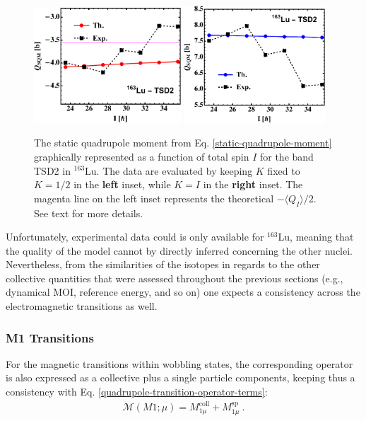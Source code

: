 \begin{figure}
    \centering
    \includegraphics[width=0.49\textwidth]{Chapters/Figures/Q_SQM_163Lu-3.pdf}
    \includegraphics[width=0.47\textwidth]{Chapters/Figures/Q_SQM_163Lu-4.pdf}
    \caption{The static quadrupole moment from Eq. \ref{static-quadrupole-moment} graphically represented as a function of total spin $I$ for the band TSD2 in $^{163}$Lu. The data are evaluated by keeping $K$ fixed to $K=1/2$ in the \textbf{left} inset, while $K=I$ in the \textbf{right} inset. The magenta line on the left inset represents the theoretical $-\langle Q_I\rangle/2$. See text for more details.}
    \label{static-quadrupole-fixed-K-TSD2}
\end{figure}

Unfortunately, experimental data could is only available for $^{163}$Lu, meaning that the quality of the model cannot by directly inferred concerning the other nuclei. Nevertheless, from the similarities of the isotopes in regards to the other collective quantities that were assessed throughout the previous sections (e.g., dynamical MOI, reference energy, and so on) one expects a consistency across the electromagnetic transitions as well.

\subsubsection{M1 Transitions}

For the magnetic transitions within wobbling states, the corresponding operator is also expressed as a collective plus a single particle components, keeping thus a consistency with Eq. \ref{quadrupole-transition-operator-terms}:
\begin{align}
    \mathcal{M}(M1;\mu)=M_{1\mu}^\text{coll}+M_{1\mu}^\text{sp}\ .
\end{align}

